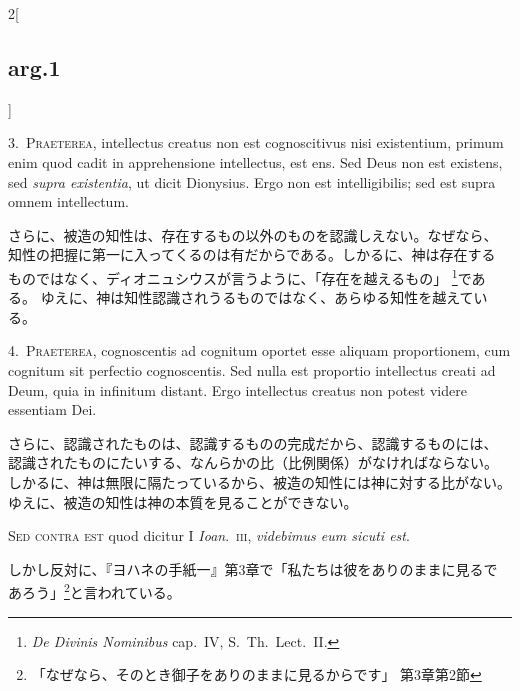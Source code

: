\documentclass[paper=a4paper,fontsize=10pt,jafontsize=9pt,titlepage]{jlreq}
\begin{document}
\begin{paracol}{2}[\subsection{arg.1}]

3.~{\scshape Praeterea}, intellectus creatus non est cognoscitivus nisi
existentium, primum enim quod cadit in apprehensione intellectus, est
ens. Sed Deus non est existens, sed {\itshape supra existentia}, ut dicit
Dionysius. Ergo non est intelligibilis; sed est supra omnem
intellectum.

\switchcolumn

さらに、被造の知性は、存在するもの以外のものを認識しえない。なぜなら、
知性の把握に第一に入ってくるのは有だからである。しかるに、神は存在する
ものではなく、ディオニュシウスが言うように、「存在を越えるもの」
\footnote{{\itshape De Divinis Nominibus} cap.~IV, S.~Th.~Lect.~II.}である。
ゆえに、神は知性認識されうるものではなく、あらゆる知性を越えている。


4.~{\scshape Praeterea}, cognoscentis ad cognitum oportet esse aliquam
proportionem, cum cognitum sit perfectio cognoscentis. Sed nulla est
proportio intellectus creati ad Deum, quia in infinitum distant. Ergo
intellectus creatus non potest videre essentiam Dei.

\switchcolumn

さらに、認識されたものは、認識するものの完成だから、認識するものには、
認識されたものにたいする、なんらかの比（比例関係）がなければならない。
しかるに、神は無限に隔たっているから、被造の知性には神に対する比がない。
ゆえに、被造の知性は神の本質を見ることができない。

\switchcolumn*[\subsection{s.c.}]

{\scshape Sed contra est} quod dicitur I {\itshape Ioan}.~{\scshape iii},
{\itshape videbimus eum sicuti est}.

\switchcolumn

しかし反対に、『ヨハネの手紙一』第3章で「私たちは彼をありのままに見るで
あろう」\footnote{「なぜなら、そのとき御子をありのままに見るからです」
第3章第2節}と言われている。



\end{paracol}
\end{document}
